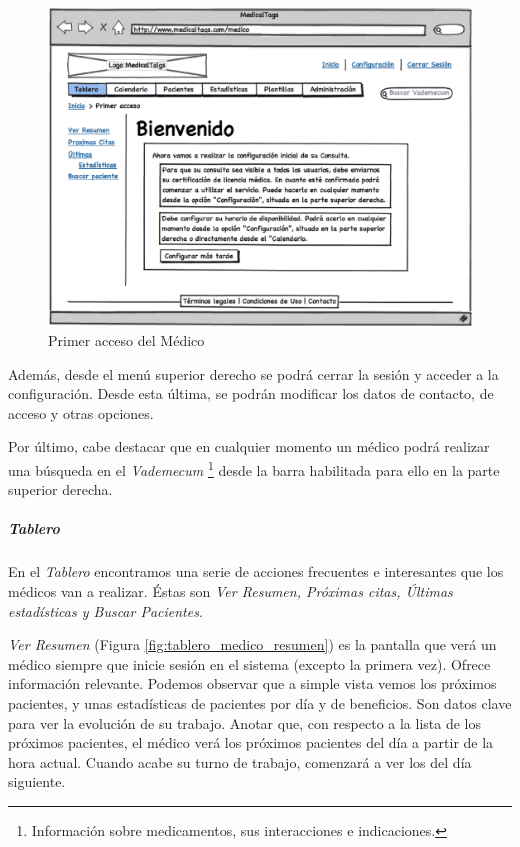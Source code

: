 		\begin{figure}[H]
		  \centering
		    \includegraphics[width=12cm]{img/eps/7_Dashboar_Medico_Inicial.eps}
		  \caption{Primer acceso del Médico}
		  \label{fig:tablero_medico_inicial}
		\end{figure}
	
		Además, desde el menú superior derecho se podrá cerrar la sesión y acceder a la configuración. Desde esta última, se podrán modificar los datos de contacto, de acceso y otras opciones.
		
		 Por último, cabe destacar que en cualquier momento un médico podrá realizar una búsqueda en el \textit{Vademecum} \footnote{Información sobre medicamentos, sus interacciones e indicaciones.} desde la barra habilitada para ello en la parte superior derecha.
		
		\subparagraph{Tablero} %
		\label{par:medico_tablero}
		
			En el \textit{Tablero} encontramos una serie de acciones frecuentes e interesantes que los médicos van a realizar. Éstas son \textit{Ver Resumen, Próximas citas, Últimas estadísticas y Buscar Pacientes}.
			
			\textit{Ver Resumen} (Figura \ref{fig:tablero_medico_resumen}) es la pantalla que verá un médico siempre que inicie sesión en el sistema (excepto la primera vez). Ofrece información relevante. Podemos observar que a simple vista vemos los próximos pacientes, y unas estadísticas de pacientes por día y de beneficios. Son datos clave para ver la evolución de su trabajo. Anotar que, con respecto a la lista de los próximos pacientes, el médico verá los próximos pacientes del día a partir de la hora actual. Cuando acabe su turno de trabajo, comenzará a ver los del día siguiente.
		
